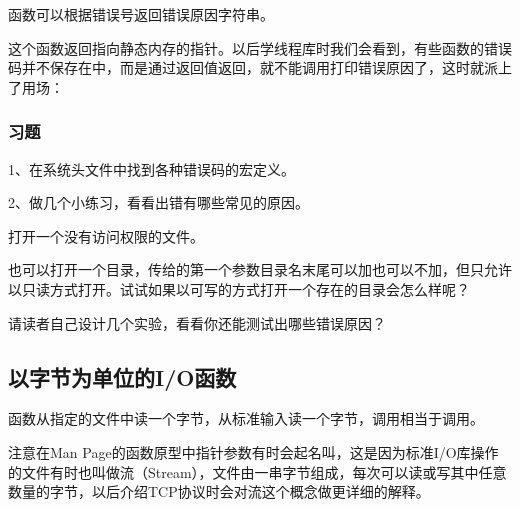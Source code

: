 函数可以根据错误号返回错误原因字符串。




这个函数返回指向静态内存的指针。以后学线程库时我们会看到，有些函数的错误码并不保存在中，而是通过返回值返回，就不能调用打印错误原因了，这时就派上了用场：



\subsubsection*{习题}
%


1、在系统头文件中找到各种错误码的宏定义。



2、做几个小练习，看看出错有哪些常见的原因。



打开一个没有访问权限的文件。




也可以打开一个目录，传给的第一个参数目录名末尾可以加\BookCode{/\BookSplit{}}也可以不加\BookCode{/\BookSplit{}}，但只允许以只读方式打开。试试如果以可写的方式打开一个存在的目录会怎么样呢？




请读者自己设计几个实验，看看你还能测试出哪些错误原因？


\subsection{以字节为单位的I/O函数}
%


函数从指定的文件中读一个字节，从标准输入读一个字节，调用相当于调用。




注意在Man Page的函数原型中指针参数有时会起名叫，这是因为标准I/\BookSplit{}O库操作的文件有时也叫做流（Stream），文件由一串字节组成，每次可以读或写其中任意数量的字节，以后介绍TCP协议时会对流这个概念做更详细的解释。



